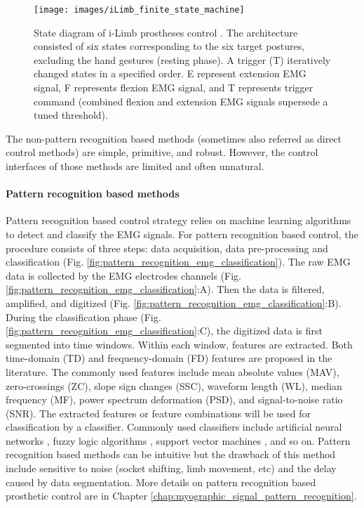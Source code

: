  \begin{figure}[ht!]
    \centering
        \texttt{[image: images/iLimb\_finite\_state\_machine]}
        \caption{State diagram of i-Limb prostheses control \cite{segil2014comparative}. The architecture consisted of six states corresponding to the six target postures, excluding the hand gestures (resting phase). A trigger (T) iteratively changed states in a specified order. E represent extension EMG signal, F represents flexion EMG signal, and T represents trigger command (combined flexion and extension EMG signals supersede a tuned threshold). }
        \label{fig:iLimb_finite_state_machine}
\end{figure}

The non-pattern recognition based methods (sometimes also referred as direct control methods) are  simple, primitive, and robust. However, the control interfaces of those methods are limited and often unnatural. 


\paragraph{Pattern recognition based methods}
Pattern recognition based control strategy relies on machine learning algorithms to detect and classify the EMG signals. 
For pattern recognition based control, the procedure consists of three steps: data acquisition, data pre-processing and classification (Fig. \ref{fig:pattern_recognition_emg_classification}). The raw EMG data is collected by the EMG electrodes channels (Fig. \ref{fig:pattern_recognition_emg_classification}:A). Then the data is filtered, amplified, and digitized (Fig. \ref{fig:pattern_recognition_emg_classification}:B). During the classification phase  (Fig. \ref{fig:pattern_recognition_emg_classification}:C), the digitized data is first segmented into time windows. Within each window, features are extracted. Both time-domain (TD) and frequency-domain (FD) features are proposed in the literature. The commonly used features include mean absolute values (MAV), zero-crossings (ZC), slope sign changes (SSC), waveform length (WL), median frequency (MF), power spectrum deformation (PSD), and signal-to-noise ratio (SNR). The extracted features or feature combinations will be used for classification by a classifier. Commonly used classifiers include artificial neural networks \cite{hiraiwa1989emg, uchida1992emg, gupta2017emg}, fuzzy logic algorithms \cite{chan2000fuzzy, micera1999hybrid}, support vector machines \cite{oskoei2008support}, and so on.  Pattern recognition based methods can be intuitive but the drawback of this method include sensitive to noise (socket shifting, limb movement, etc) and the delay caused by data segmentation. More details on pattern recognition based prosthetic control are in Chapter \ref{chap:myographic_signal_pattern_recognition}. 



